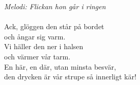 {\footnotesize\textit{Melodi: Flickan hon går i ringen}}\\
\\
Ack, glöggen den står på bordet\\
och ångar sig varm.\\
Vi häller den ner i halsen \\
och värmer vår tarm.\\
En här, en där, utan minsta besvär,\\
den drycken är vår strupe så innerligt kär!
